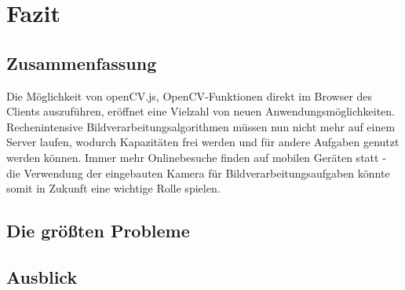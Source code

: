 \section{Fazit}

\subsection{Zusammenfassung}
Die Möglichkeit von openCV.js, OpenCV-Funktionen direkt im Browser des Clients auszuführen, eröffnet eine Vielzahl von neuen Anwendungsmöglichkeiten. Rechenintensive Bildverarbeitungsalgorithmen müssen nun nicht mehr auf einem Server laufen, wodurch Kapazitäten frei werden und für andere Aufgaben genutzt werden können. Immer mehr Onlinebesuche finden auf mobilen Geräten statt - die Verwendung der eingebauten Kamera für Bildverarbeitungsaufgaben könnte somit in Zukunft eine wichtige Rolle spielen. 

\subsection{Die größten Probleme}

\subsection{Ausblick}